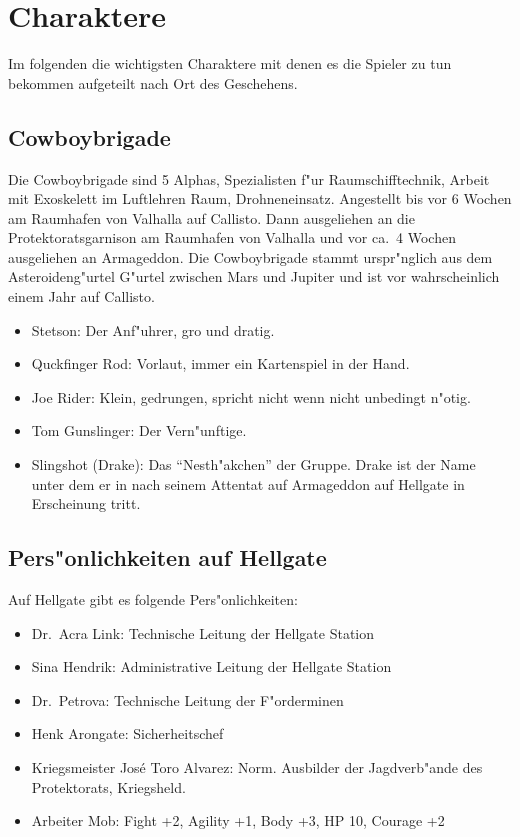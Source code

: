 \section{Charaktere}

Im folgenden die wichtigsten Charaktere mit denen es die Spieler zu tun bekommen aufgeteilt nach Ort des Geschehens.

\subsection{Cowboybrigade}

Die Cowboybrigade sind 5 Alphas, Spezialisten f"ur Raumschifftechnik, Arbeit mit Exoskelett im Luftlehren Raum, Drohneneinsatz.
Angestellt bis vor 6 Wochen am Raumhafen von Valhalla auf Callisto. Dann ausgeliehen an die Protektoratsgarnison am Raumhafen von Valhalla und vor ca.~4 Wochen ausgeliehen an Armageddon. Die Cowboybrigade stammt urspr"nglich aus dem Asteroideng"urtel G"urtel zwischen Mars und Jupiter und ist vor wahrscheinlich einem Jahr auf Callisto.

\begin{itemize}
    \item Stetson: Der Anf"uhrer, gro\3 und dratig.
    \item Quckfinger Rod: Vorlaut, immer ein Kartenspiel in der Hand.
    \item Joe Rider: Klein, gedrungen, spricht nicht wenn nicht unbedingt n"otig.
    \item Tom Gunslinger: Der Vern"unftige.
    \item Slingshot (Drake): Das "`Nesth"akchen"' der Gruppe. Drake ist der Name unter dem er in nach seinem Attentat 
    auf Armageddon auf Hellgate in Erscheinung tritt.
\end{itemize}

\newpage

\subsection{Pers"onlichkeiten auf Hellgate}

Auf Hellgate gibt es folgende Pers"onlichkeiten: 

\begin{itemize}
    \item Dr.~Acra Link: Technische Leitung der Hellgate Station
    \item Sina Hendrik: Administrative Leitung der Hellgate Station
    \item Dr.~Petrova: Technische Leitung der F"orderminen
    \item Henk Arongate: Sicherheitschef    
    \item Kriegsmeister Jos\'{e} \frqq{}Toro\flqq{} Alvarez: Norm. Ausbilder der Jagdverb"ande des Protektorats, Kriegsheld.
    \item Arbeiter Mob: Fight +2, Agility +1, Body +3, HP 10, Courage +2
\end{itemize}

